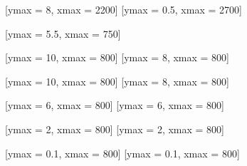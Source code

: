 \documentclass[tikz]{standalone}
\begin{document}
[ymax =   8, xmax = 2200]
[ymax = 0.5, xmax = 2700]

[ymax = 5.5, xmax =  750]

[ymax = 10, xmax = 800]
[ymax = 8, xmax = 800]

[ymax = 10, xmax = 800]
[ymax = 8, xmax = 800]

[ymax = 6, xmax = 800]
[ymax = 6, xmax = 800]

[ymax = 2, xmax = 800]
[ymax = 2, xmax = 800]

[ymax = 0.1, xmax = 800]
[ymax = 0.1, xmax = 800]

\end{document}
